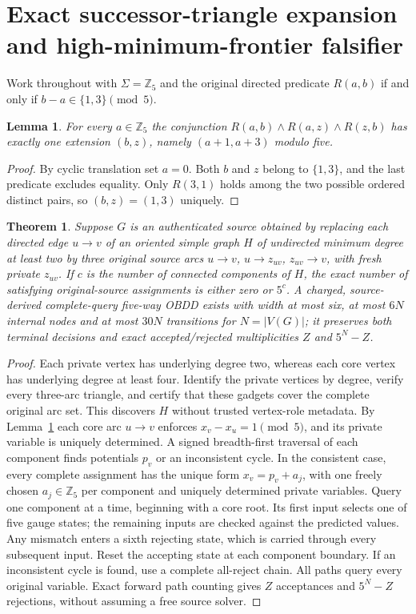 \documentclass[11pt]{article}
\newtheorem{theorem}{Theorem}
\newtheorem{lemma}{Lemma}
\begin{document}
\section{Exact successor-triangle expansion and high-minimum-frontier falsifier}\label{sec:t5affine088}
Work throughout with $\Sigma=\mathbb Z_5$ and the original
directed predicate $R(a,b)$ if and only if
$b-a\in\{1,3\}\pmod5$.
\begin{lemma}\label{lem:t5triangle088}
For every $a\in\mathbb Z_5$ the conjunction
$R(a,b)\wedge R(a,z)\wedge R(z,b)$ has exactly one
extension $(b,z)$, namely $(a+1,a+3)$ modulo five.
\end{lemma}
\begin{proof}
By cyclic translation set $a=0$. Both $b$ and $z$
belong to $\{1,3\}$, and the last predicate excludes
equality. Only $R(3,1)$ holds among the two possible
ordered distinct pairs, so $(b,z)=(1,3)$ uniquely.
\end{proof}
\begin{theorem}\label{thm:t5affine088}
Suppose $G$ is an authenticated source obtained by
replacing each directed edge $u\to v$ of an oriented
simple graph $H$ of undirected minimum degree at least
two by three \emph{original} source arcs
$u\to v$, $u\to z_{uv}$, $z_{uv}\to v$,
with fresh private $z_{uv}$.
If $c$ is the number of connected components of $H$,
the exact number of satisfying original-source assignments
is either zero or $5^c$. A charged, source-derived complete-query
five-way OBDD exists with width at most six, at most $6N$
internal nodes and at most $30N$ transitions for
$N=|V(G)|$; it preserves both terminal decisions and
exact accepted/rejected multiplicities $Z$ and $5^N-Z$.
\end{theorem}
\begin{proof}
Each private vertex has underlying degree two, whereas
each core vertex has underlying degree at least four.
Identify the private vertices by degree, verify every
three-arc triangle, and certify that these gadgets
cover the complete original arc set. This discovers
$H$ without trusted vertex-role metadata.
By Lemma~\ref{lem:t5triangle088} each core arc
$u\to v$ enforces $x_v-x_u=1\pmod5$,
and its private variable is uniquely determined.
A signed breadth-first traversal of each component
finds potentials $p_v$ or an inconsistent cycle.
In the consistent case, every complete assignment
has the unique form $x_v=p_v+a_j$, with one freely
chosen $a_j\in\mathbb Z_5$ per component and
uniquely determined private variables.
Query one component at a time, beginning with a core
root. Its first input selects one of five gauge states;
the remaining inputs are checked against the predicted
values. Any mismatch enters a sixth rejecting state,
which is carried through every subsequent input.
Reset the accepting state at each component boundary.
If an inconsistent cycle is found, use a complete
all-reject chain. All paths query every original variable.
Exact forward path counting gives $Z$ acceptances and
$5^N-Z$ rejections, without assuming a free source solver.
\end{proof}
\end{document}
